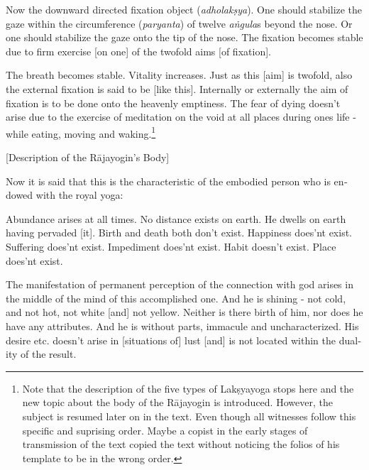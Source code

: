 \begin{otherlanguage}{english}
    \bigskip
  \begin{tlate}
    Now the downward directed fixation object (\textit{adholakṣya}). One should stabilize the gaze within the circumference (\textit{paryanta}) of twelve \textit{aṅgula}s beyond the nose. Or one should stabilize the gaze onto the tip of the nose. The fixation becomes stable due to firm exercise [on one] of the twofold aims [of fixation].
    \end{tlate}
  \begin{tlate}
The breath becomes stable. Vitality increases. Just as this [aim] is twofold, also the external fixation is said to be [like this]. Internally or externally the aim of fixation is to be done onto the heavenly emptiness. The fear of dying doesn't arise due to the exercise of meditation on the void at all places during ones life - while eating, moving and waking.\footnote{Note that the description of the five types of Lakṣyayoga stops here and the new topic about the body of the Rājayogin is introduced. However, the subject is resumed later on in the text. Even though all witnesses follow this specific and suprising order. Maybe a copist in the early stages of transmission of the text copied the text without noticing the folios of his template to be in the wrong order.}
  \end{tlate}
    \bigskip
    \centerline{\textrm{\small{[Description of the Rājayogin's Body]}}}
    \bigskip
      \begin{tlate}
Now it is said that this is the characteristic of the embodied person who is endowed with the royal yoga:
      \end{tlate}
    \begin{tlate}
Abundance arises at all times. No distance exists on earth. He dwells on earth having pervaded [it]. Birth and death both don't exist. Happiness does'nt exist. Suffering does'nt exist. Impediment does'nt exist. Habit doesn't exist. Place does'nt exist.
    \end{tlate}
    \begin{tlate}
The manifestation of permanent perception of the connection with god arises in the middle of the mind of this accomplished one. And he is shining - not cold, and not hot, not white [and] not yellow. Neither is there birth of him, nor does he have any attributes. And he is without parts, immacule and uncharacterized. His desire etc. doesn't arise in [situations of] lust [and] is not located within the duality of the result.

\end{tlate}
\end{otherlanguage}
